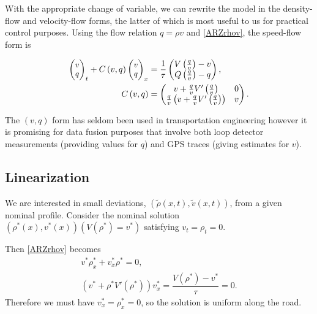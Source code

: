 \documentclass[letterpaper, 10 pt, conference]{ieeeconf}  %
\begin{document}
With the appropriate change of variable, we can rewrite the model in the density-flow and velocity-flow forms, the latter of which is most useful to us for practical control purposes. Using the flow relation $q = \rho v$ and \eqref{ARZrhov}, the speed-flow form is

{\footnotesize
\begin{subequations}
\begin{align}
\footnotesize
\begin{pmatrix}
	v \\ 
	q
\end{pmatrix}_t
+ C\left(v, q\right)
\begin{pmatrix}
	v \\ 
	q
\end{pmatrix}_x 
&=
\dfrac{1}{\tau}
\begin{pmatrix}
	V\left( \frac{q}{v}\right) - v \\
	Q\left( \frac{q}{v}\right) - q
\end{pmatrix}\label{ARZvq}, \\
C\left(v, q \right)
&=
\begin{pmatrix}
	v + \frac{q}{v} V'\left( \frac{q}{v} \right) & 0 \\
	\frac{q}{v} \left( v + \frac{q}{v} V'\left( \frac{q}{v} \right) \right) & v
\end{pmatrix}.
\end{align}
\end{subequations}
}

The $\left(v, q \right)$ form has seldom been used in transportation engineering however it is promising for data fusion purposes that involve both loop detector measurements (providing values for $q$) and GPS traces (giving estimates for $v$).

\subsection{Linearization}
We are interested in small deviations, $(\tilde{\rho}(x,t), \tilde{v}(x,t))$, from a given nominal profile. Consider the nominal solution $(\rho^*(x),v^*(x))(V(\rho^*) = v^*)$ satisfying $v_t = \rho_t = 0$. 

Then \eqref{ARZrhov} becomes
\begin{align}
v^* \rho^*_x + v^*_x\rho^* = 0, \\
( v^* + \rho^* V'( \rho^*) )v^*_x = \dfrac{V(\rho^*) - v^*}{\tau} = 0.
\end{align}
Therefore we must have $v^*_x=\rho^*_x=0$, so the solution is uniform along the road. 
\end{document}
